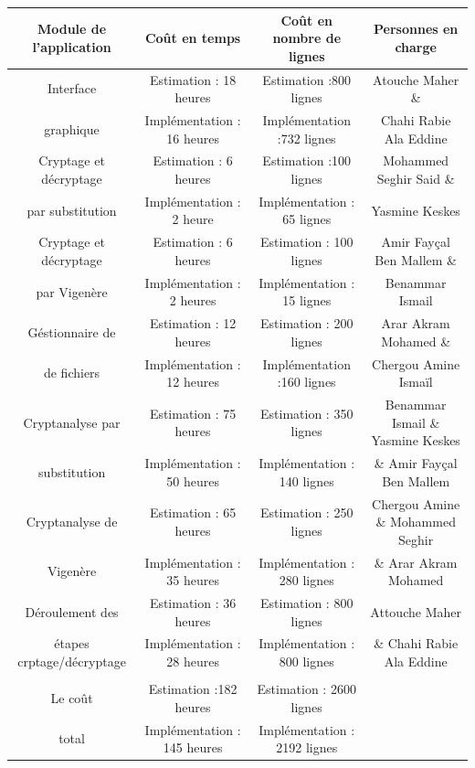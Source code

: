 \documentclass[11pt]{article}
\begin{document}
\begin{enumerate}
\small
\hspace{-2cm}
\begin{tabular}{|c|c|c|c|}
  \hline
  \textbf{Module de l'application} & \textbf{Coût en temps} & \textbf{Coût en nombre de lignes} & \textbf{Personnes en charge} \\
  \hline
    Interface & Estimation : 18 heures & Estimation :800 lignes & Atouche Maher \& \\ 
    graphique & Implémentation : 16 heures & Implémentation :732 lignes & Chahi Rabie Ala Eddine \\
  \hline
    Cryptage et décryptage & Estimation : 6 heures & Estimation :100 lignes & Mohammed Seghir Said \& \\
  par substitution & Implémentation : 2 heure & Implémentation : 65 lignes  & Yasmine Keskes \\
  \hline
  Cryptage et décryptage & Estimation : 6 heures & Estimation : 100 lignes & Amir Fayçal Ben Mallem  \& \\
   par Vigenère & Implémentation : 2 heures & Implémentation : 15 lignes & Benammar Ismail \\
  \hline
    Géstionnaire de & Estimation : 12 heures & Estimation : 200 lignes & Arar Akram Mohamed \& \\
   de fichiers & Implémentation : 12 heures & Implémentation :160 lignes & Chergou Amine Ismaïl \\
  \hline
    Cryptanalyse par & Estimation : 75 heures & Estimation : 350 lignes &  Benammar Ismail \&  Yasmine Keskes  \\
   substitution & Implémentation : 50 heures & Implémentation : 140 lignes & \& Amir Fayçal Ben Mallem \\
    \hline
    Cryptanalyse de & Estimation : 65 heures & Estimation : 250 lignes & Chergou Amine \&  Mohammed Seghir  \\
   Vigenère & Implémentation : 35 heures & Implémentation : 280 lignes & \& Arar Akram Mohamed \\
   \hline
    Déroulement des & Estimation : 36 heures & Estimation : 800 lignes & Attouche Maher  \\
   étapes crptage/décryptage & Implémentation : 28 heures & Implémentation : 800 lignes & \& Chahi Rabie Ala Eddine \\
  \hline
    & & &  \\
   Le coût  & Estimation :182  heures & Estimation : 2600 lignes & \\
   total & Implémentation : 145 heures & Implémentation : 2192 lignes &  \\  
  \hline
\end{tabular}
\normalsize
\vspace{0.5cm}


\end{enumerate}
\end{document}
